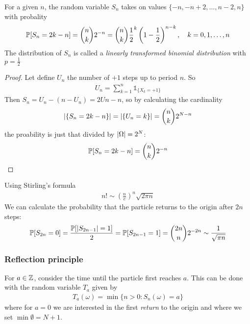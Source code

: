 \begin{prop}[]
For a given $n$, the random variable $S_n$ takes on values $\{-n, -n + 2, \ldots, n-2, n\}$ with probality
\begin{align*}
  \mathbb{P}[S_n = 2k - n] = \binom{n}{k}2^{-n} = \binom{n}{k} \frac{1}{2}^{k} \left(
    1 - \frac{1}{2}
  \right)^{n-k}, \quad k = 0,1,\ldots,n
\end{align*}
The distribution of $S_n$ is  called a \emph{linearly transformed binomial distribution} with $p = \frac{1}{2}$
\end{prop}
\begin{proof}
Let define $U_n$ the number of $+1$ steps up to period $n$. So
\begin{align*}
  U_n = \sum_{k=1}^{n}\mathds{1}_{\{X_k = +1\}}
\end{align*}
Then $S_n = U_n - (n- U_n) = 2Un - n$, so by calculating the cardinality
\begin{align*}
  \vert\{S_n = 2k - n\}\vert = \vert\{U_n = k\}\vert = \binom{n}{k}2^{N-n}
\end{align*}
the proability is just that divided by $\vert\Omega\vert = 2^{N}$:
\begin{align*}
  \mathbb{P}[S_n = 2k -n] = \binom{n}{k}2^{-n}
\end{align*}
\end{proof}
Using Stirling's formula
\begin{align*}
  n! \sim \left(
    \frac{n}{e}
  \right)^{n} \sqrt{2 \pi n}
\end{align*}
We can calculate the probability that the particle returns to the origin after $2n$ steps:
\begin{align*}
  \mathbb{P}[S_{2n} = 0] = \frac{\mathbb{P}[\vert S_{2n - 1}\vert = 1]}{2} = \mathbb{P}[S_{2n-1} = 1] = \binom{2n}{n}2^{-2n} \sim \frac{1}{\sqrt{\pi n}}
\end{align*}

\subsubsection{Reflection principle}

For $a \in \mathbb{Z}$, consider the time until the particle first reaches $a$. This can be done with the random variable $T_a$ given by
\begin{align*}
  T_a(\omega) = \min \{n > 0: S_n(\omega) = a\}
\end{align*}
where for $a = 0$ we are interested in the first \emph{return} to the origin and where we set $\min \emptyset = N+1$.

